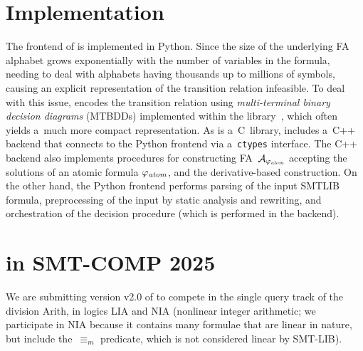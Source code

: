 \documentclass[acmsmall,screen,nonacm=true]{acmart}
\begin{document}
\vspace{-0.0mm}
\section{Implementation}\label{sec:label}
\vspace{-0.0mm}

The frontend of \amaya is implemented in Python.
Since the size of the underlying FA alphabet grows exponentially with the
number of variables in the formula, needing to deal with alphabets having
thousands up to millions of symbols, causing an explicit representation of the
transition relation infeasible.
To deal with this issue, \amaya encodes the transition relation using
\emph{multi-terminal binary decision diagrams} (MTBDDs) implemented within the
\sylvan library~\cite{DijkP15}, which often yields a~much more compact representation.
As \sylvan is a~C~library, \amaya includes a~C++ backend that connects to the
Python frontend via a~\texttt{ctypes} interface. The C++ backend also implements
procedures for constructing FA~$\mathcal{A}_{\varphi_{\mathit{atom}}}$ accepting the solutions
of an atomic formula $\varphi_{\mathit{atom}}$, and the derivative-based
construction.
On the other hand, the Python frontend performs parsing of the input SMTLIB
formula, preprocessing of the input by static analysis and rewriting, and
orchestration of the decision procedure (which is performed in the backend).




\vspace{-0.0mm}
\section{\amaya in SMT-COMP 2025}\label{sec:label}
\vspace{-0.0mm}


We are submitting version v2.0 of \amaya to compete in the single query track
of the division Arith, in logics LIA and NIA (nonlinear integer arithmetic; we
participate in NIA because it contains many formulae that are linear in nature, but
include the~$\equiv_m$ predicate, which is not considered linear by SMT-LIB).








\end{document}
